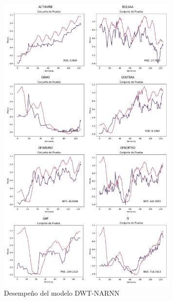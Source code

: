 \begin{figure}[H]
    \centering
    \includegraphics[width=0.8\textwidth]{Figuras/analisis/DWT_NARNN.png}
    \caption{Desempeño del modelo DWT-NARNN} 
    \label{fig:desempenio_DWTNARNN}
\end{figure}

